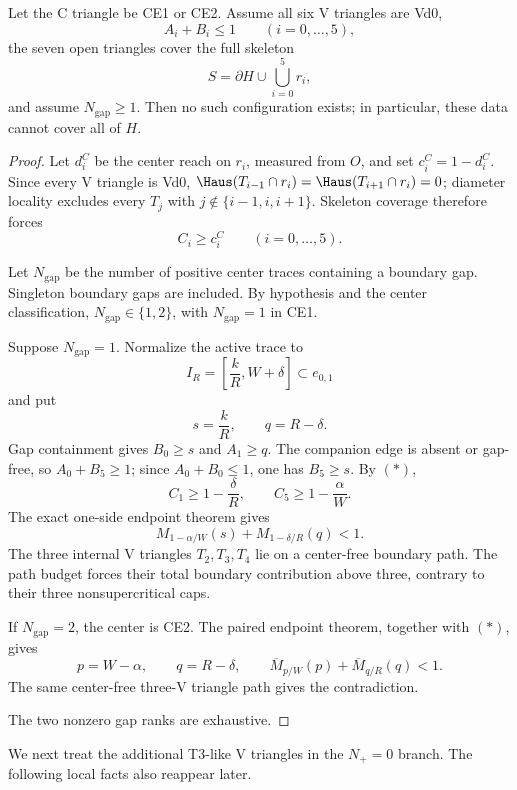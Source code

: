 \begin{proposition}
\label{prop:nplus-zero-all-vd0}
Let the C triangle be CE1 or CE2. Assume all six V triangles are Vd0,
\[
 A_i+B_i\le1\qquad(i=0,\ldots,5),
\]
the seven open triangles cover the full skeleton
\[
 S=\partial H\cup\bigcup_{i=0}^5r_i,
\]
and assume $N_{\mathrm{gap}}\ge1$.  Then no such configuration exists; in
particular, these data cannot cover all of $H$.
\end{proposition}

\begin{proof}
Let $d_i^C$ be the center reach on $r_i$, measured from $O$, and set
$c_i^C=1-d_i^C$. Since every V triangle is Vd0,
$\Haus(T_{i-1}\cap r_i)=\Haus(T_{i+1}\cap r_i)=0$; diameter locality
excludes every $T_j$ with $j\notin\{i-1,i,i+1\}$.
Skeleton coverage therefore forces
\[
 C_i\ge c_i^C\qquad(i=0,\ldots,5).
\tag{\(*\)}
\]

Let $N_{\mathrm{gap}}$ be the number of positive center traces containing a
boundary gap. Singleton boundary gaps are included. By hypothesis and the
center classification, $N_{\mathrm{gap}}\in\{1,2\}$, with
$N_{\mathrm{gap}}=1$ in CE1.

Suppose $N_{\mathrm{gap}}=1$. Normalize the active trace to
\[
 I_R=\left[\frac{k}{R},W+\delta\right]\subset e_{0,1}
\]
and put
\[
 s=\frac{k}{R},\qquad q=R-\delta.
\]
Gap containment gives $B_0\ge s$ and $A_1\ge q$. The companion edge is
absent or gap-free, so $A_0+B_5\ge1$; since $A_0+B_0\le1$, one has
$B_5\ge s$. By \((*)\),
\[
 C_1\ge1-\frac\delta R,
 \qquad
 C_5\ge1-\frac\alpha W.
\]
The exact one-side endpoint theorem gives
\[
 M_{1-\alpha/W}(s)
 +M_{1-\delta/R}(q)<1.
\]
The three internal V triangles $T_2,T_3,T_4$ lie on a center-free boundary
path. The path budget forces their total boundary contribution above three,
contrary to their three nonsupercritical caps.

If $N_{\mathrm{gap}}=2$, the center is CE2. The paired endpoint theorem, together
with \((*)\), gives
\[
 p=W-\alpha,\qquad q=R-\delta,
 \qquad \overline M_{p/W}(p)+\overline M_{q/R}(q)<1.
\]
The same center-free three-V triangle path gives the contradiction.

The two nonzero gap ranks are exhaustive.
\end{proof}

We next treat the additional T3-like V triangles in the $N_+=0$ branch.  The
following local facts also reappear later.

